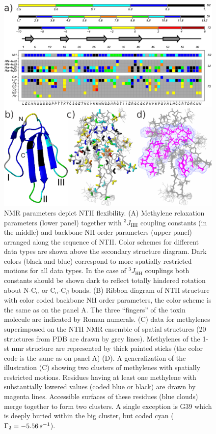 \documentclass[twocolumn]{svjour3}           %
\begin{document}
\begin{figure}
    \centering
    \includegraphics[width=\textwidth]{Fig5_G2_struct.pdf}
    \caption{NMR parameters depict NTII flexibility.
    (A) Methylene relaxation parameters \gtwo{} (lower panel) together with
    $^3J_\text{HH}$
    coupling constants (in the middle) and backbone NH order parameters 
    (upper panel) arranged along the sequence of NTII. 
    Color schemes for different data types are shown above the secondary 
    structure diagram. Dark colors (black and blue) correspond to more 
    spatially restricted motions for all data types. 
    In the case of $^3J_\text{HH}$ couplings both constants should be shown dark 
    to reflect totally hindered rotation about N-$\text{C}_\alpha$ or 
    $\text{C}_\alpha$-$\text{C}_\beta$ bonds.
    (B) Ribbon diagram of NTII structure with color coded backbone NH order parameters, the color scheme is the same as on the panel A. 
    The three \enquote{fingers} of the toxin molecule are indicated by Roman numerals.
    (C) \gtwo{} data for methylenes superimposed on the NTII NMR ensemble of 
    spatial structures (20 structures from PDB are drawn by grey lines). 
    Methylenes of the 1-st nmr structure are represented by thick painted 
    sticks  (the color code is the same as on panel A) 
    (D). A generalization of the illustration (C) showing two clusters 
    of methylenes with spatially restricted motions. Residues having 
    at least one methylene with substantially lowered  \gtwo{} values 
    (coded blue or black) are drawn by magenta lines. Accessible surfaces 
    of these residues (blue clouds) merge together to form two clusters. 
    A single exception is G39 which is deeply buried within the big cluster, 
    but coded cyan ($\Gamma_2=-5.56\,s^{-1}$). 
    }
    \label{fig:g2:struct}
\end{figure}
\end{document}

